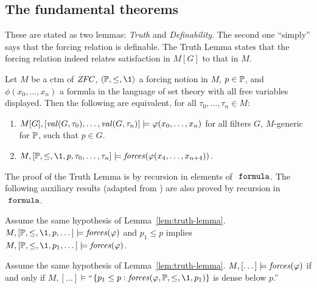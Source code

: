 \subsection{The fundamental theorems}
These are stated as two lemmas: \emph{Truth} and
\emph{Definability}. The second one ``simply'' says that the forcing
relation is definable. The Truth Lemma states that the forcing
relation indeed relates 
satisfaction in $M[G]$ to that in $M$. 
\begin{lemma}\label{lem:truth-lemma}
  Let $M$ be a ctm of $\mathit{ZFC}$, $\lb\PP,\leq,\1\rb$ a forcing notion
  in $M$, $p\in\mathbb{P}$, and $\phi(x_0,\dots,x_n)$ a formula in the
  language of set 
  theory with all free variables displayed. Then the
  following are equivalent, for all $\tau_0,\dots,\tau_n\in M$: 
  \begin{enumerate}
  \item $M[G],[\operatorname{\mathit{val}}(G,\tau_0),\dots,\operatorname{\mathit{val}}(G,\tau_n)]
  \models\varphi(x_0,\dots,x_n)$ for 
    all filters $G$, $M$-generic for $\mathbb{P}$, such that $p\in G$.
  \item $  M,[\PP,\leq,\1,p,\tau_0,\dots,\tau_n] 
  \models\forceisa(\phi(x_4,\dots,x_{n+4}))$.
  \end{enumerate}
\end{lemma}
The proof of the Truth Lemma is by recursion in elements of
$\formula$. The following auxiliary results (adapted from
\cite[IV.2.43]{kunen2011set}) are also proved by recursion in
$\formula$.
\begin{lemma}[Strenghtening]\label{lem:strengthen} 
  Assume the same hypothesis of Lemma~\ref{lem:truth-lemma}.
  $M, [\PP,\leq,\1,p,\dots]\models\forceisa(\phi)$ and $p_1\leq p$
  implies $M, [\PP,\leq,\1,p_1,\dots]\models\forceisa(\phi)$.
\end{lemma}
\begin{lemma}[Density]\label{lem:density}
  Assume the same hypothesis of
  Lemma~\ref{lem:truth-lemma}. $M,[\dots]\models\mathop{\mathit{forces}}(\varphi)$ 
  if and only if 
  $M,[\dots]\models$``$\{p_1\leq p : \forceisa(\phi,\PP,\leq,\1,p_1)\}$ is
  dense below $p$.''
\end{lemma}


